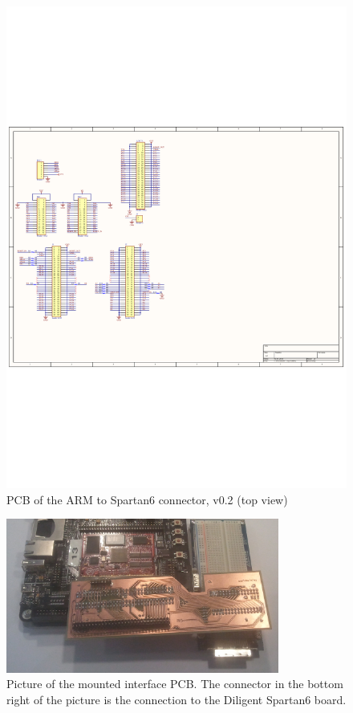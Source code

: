 \begin{figure}[H]
	\begin{centering}
		 \includegraphics[height=0.8\textwidth,page=2,angle=90]{images/dig_to_ea_v0_2}
		\caption{PCB of the ARM to Spartan6 connector, v0.2 (top view)}
	\end{centering}
\end{figure}

\begin{figure}[H]
	\begin{centering}
		\includegraphics[width=0.8\textwidth,page=1,angle=0]{images/interface_photo_v0_2.jpg}
		\caption{Picture of the mounted interface PCB. The connector in the bottom right of the picture is the connection to the Diligent Spartan6 board.}
		\label{fig:interface_photo_v0_2}
	\end{centering}
\end{figure}

